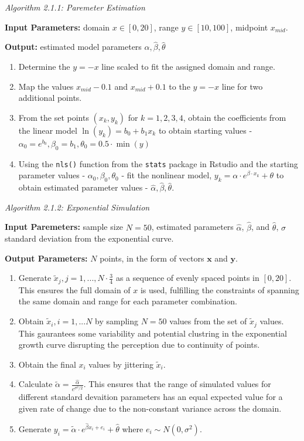 \documentclass[print]{nuthesis}
\begin{document}
\noindent \textit{Algorithm 2.1.1: Paremeter Estimation}

\noindent \textbf{Input Parameters:} domain \(x\in[0,20]\), range \(y\in[10,100]\), midpoint \(x_{mid}\).

\noindent \textbf{Output:} estimated model parameters \(\hat\alpha, \hat\beta, \hat\theta\)

\begin{enumerate}
\def\labelenumi{\arabic{enumi}.}
\item
  Determine the \(y=-x\) line scaled to fit the assigned domain and range.
\item
  Map the values \(x_{mid} - 0.1\) and \(x_{mid} + 0.1\) to the \(y=-x\) line for two additional points.
\item
  From the set points \((x_k, y_k)\) for \(k = 1,2,3,4\), obtain the coefficients from the linear model \(\ln(y_k) = b_0 +b_1x_k\) to obtain starting values - \(\alpha_0 = e^{b_0}, \beta_0 = b_1, \theta_0 = 0.5\cdot \min(y)\)
\item
  Using the \texttt{nls()} function from the \texttt{stats} package in Rstudio and the starting parameter values - \(\alpha_0, \beta_0, \theta_0\) - fit the nonlinear model, \(y_k = \alpha\cdot e^{\beta\cdot x_k}+\theta\) to obtain estimated parameter values - \(\hat\alpha, \hat\beta, \hat\theta.\)
\end{enumerate}

\noindent\textit{Algorithm 2.1.2: Exponential Simulation}

\noindent \textbf{Input Paremeters:} sample size \(N = 50\), estimated parameters \(\hat\alpha\), \(\hat\beta\), and \(\hat\theta\), \(\sigma\) standard deviation from the exponential curve.

\noindent \textbf{Output Parameters:} \(N\) points, in the form of vectors \(\mathbf{x}\) and \(\mathbf{y}\).

\begin{enumerate}
\def\labelenumi{\arabic{enumi}.}
\item
  Generate \(\tilde x_j, j = 1,..., N\cdot \frac{3}{4}\) as a sequence of evenly spaced points in \([0,20]\). This ensures the full domain of \(x\) is used, fulfilling the constraints of spanning the same domain and range for each parameter combination.
\item
  Obtain \(\tilde x_i, i = 1,...N\) by sampling \(N = 50\) values from the set of \(\tilde x_j\) values. This gaurantees some variability and potential clustring in the exponential growth curve disrupting the perception due to continuity of points.
\item
  Obtain the final \(x_i\) values by jittering \(\tilde x_i\).
\item
  Calculate \(\tilde\alpha = \frac{\hat\alpha}{e^{\sigma^2/2}}.\) This ensures that the range of simulated values for different standard devaition parameters has an equal expected value for a given rate of change due to the non-constant variance across the domain.
\item
  Generate \(y_i = \tilde\alpha\cdot e^{\hat\beta x_i + e_i}+\hat\theta\) where \(e_i\sim N(0,\sigma^2).\)
\end{enumerate}
\end{document}
